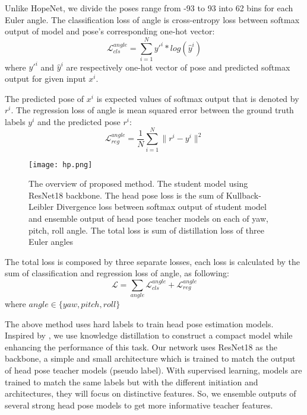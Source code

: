 \documentclass[a4paper,twoside]{article}
\begin{document}
Unlike HopeNet, we divide the poses range from -93 to 93 into 62 bins for each Euler angle. The classification loss of angle is cross-entropy loss between softmax output of model and pose’s corresponding one-hot vector:
\begin{equation}
    \mathcal{L}_{cls}^{angle} = \sum_{i = 1}^{N} y'^{i}*log(\hat{y}^{i})
\end{equation}
where $y'^{i}$ and $\hat{y}^{i}$ are respectively one-hot vector of pose and predicted softmax output for given input $x^{i}$.

The predicted pose of $x^{i}$ is expected values of softmax output that is denoted by $r^{i}$. The regression loss of angle is mean squared error between the ground truth labels $y^{i}$ and the predicted pose $r^{i}$:
\begin{equation}
    \mathcal{L}_{reg}^{angle} = \frac{1}{N}\sum_{i = 1}^{N} \|r^{i} - y^{i}\|^2
\end{equation}

\begin{figure*}[htp]
    \centering
    \texttt{[image: hp.png]}
    \caption{The overview of proposed method. The student model using ResNet18 backbone. The head pose loss is the sum of Kullback-Leibler Divergence loss between softmax output of student model and ensemble output of head pose teacher models on each of yaw, pitch, roll angle. The total loss is sum of distillation loss of three Euler angles}
    \label{fig:galaxy}
\end{figure*}

The total loss is composed by three separate losses, each loss is calculated by the sum of classification and regression loss of angle, as following:
\begin{equation}
    \mathcal{L} = \sum_{angle} \mathcal{L}_{cls}^{angle} + \mathcal{L}_{reg}^{angle}
\end{equation}
where \textit{$angle \in \{yaw, pitch, roll\}$}

The above method uses hard labels to train head pose estimation models. Inspired by \cite{hinton2015distilling}, we use knowledge distillation to construct a compact model while enhancing the performance of this task. Our network uses ResNet18 \cite{he2016deep} as the backbone, a simple and small architecture which is trained to match the output of head pose teacher models (pseudo label). With supervised learning, models are trained to match the same labels but with the different initiation and architectures, they will focus on distinctive features. So, we ensemble outputs of several strong head pose models to get more informative teacher features.
\end{document}
